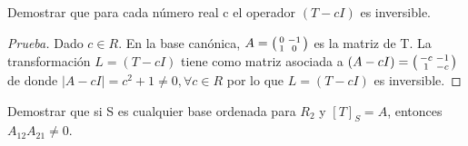 \documentclass[12pt]{article}
\newenvironment{problem}[2][Problem]{\begin{trivlist}
\item[\hskip \labelsep {\bfseries #1}\hskip \labelsep {\bfseries #2.}]}{\end{trivlist}}
\newenvironment{xmat}
  {\left(\begin{smallmatrix}}
  {\end{smallmatrix}\right)}
\begin{document}
\begin{problem}[Problema]{4.c}
Demostrar que para cada número real c el operador $(T - cI)$  es inversible.
\end{problem}

\begin{proof} [Prueba]
Dado $c \in R$. En la base canónica, $A=\begin{xmat}0 & -1\\1 & 0\end{xmat}$ es la matriz de T. La transformación $L=(T-cI)$ tiene como matriz asociada a $(A-cI)=\begin{xmat}-c & -1\\1 & -c\end{xmat}$ de donde $|A-cI|=c^{2}+1 \neq 0, \forall c \in R$ por lo que $L=(T-cI)$ es inversible.
\end{proof} 

\begin{problem}[Problema]{4.d}
Demostrar que si S es cualquier base ordenada para $R_{2}$ y $[T]_{S} = A$, entonces $A_{12}A_{21} \neq 0$.
\end{problem}
\end{document}
